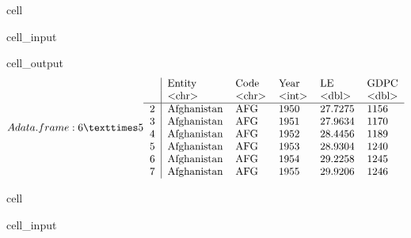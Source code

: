 \documentclass[letterpaper,10pt,english]{jupyterBook}
\begin{document}
\begin{sphinxuseclass}{cell}\begin{sphinxVerbatimInput}

\begin{sphinxuseclass}{cell_input}
\begin{sphinxVerbatim}[commandchars=\\\{\}]
\end{sphinxVerbatim}

\end{sphinxuseclass}\end{sphinxVerbatimInput}
\begin{sphinxVerbatimOutput}

\begin{sphinxuseclass}{cell_output}\begin{equation*}
\begin{split}A data.frame: 6 × 5
\begin{tabular}{r|lllll}
  & Entity & Code & Year & LE & GDPC\\
  & <chr> & <chr> & <int> & <dbl> & <dbl>\\
\hline
	2 & Afghanistan & AFG & 1950 & 27.7275 & 1156\\
	3 & Afghanistan & AFG & 1951 & 27.9634 & 1170\\
	4 & Afghanistan & AFG & 1952 & 28.4456 & 1189\\
	5 & Afghanistan & AFG & 1953 & 28.9304 & 1240\\
	6 & Afghanistan & AFG & 1954 & 29.2258 & 1245\\
	7 & Afghanistan & AFG & 1955 & 29.9206 & 1246\\
\end{tabular}\end{split}
\end{equation*}
\end{sphinxuseclass}\end{sphinxVerbatimOutput}

\end{sphinxuseclass}
\begin{sphinxuseclass}{cell}\begin{sphinxVerbatimInput}

\begin{sphinxuseclass}{cell_input}
\begin{sphinxVerbatim}[commandchars=\\\{\}]
\PYG{p}{[}\PYG{p}{]}
\end{sphinxVerbatim}

\end{sphinxuseclass}\end{sphinxVerbatimInput}

\end{sphinxuseclass}
\end{document}

